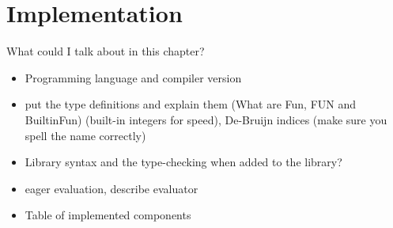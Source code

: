 \chapter{Implementation} \label{ch:implementation}

What could I talk about in this chapter?
\begin{itemize}
\item Programming language and compiler version
\item put the type definitions and explain them (What are Fun, FUN and BuiltinFun) (built-in integers for speed), De-Bruijn indices (make sure you spell the name correctly)
\item Library syntax and the type-checking when added to the library?
\item eager evaluation, describe evaluator
\item Table of implemented components
\end{itemize}



